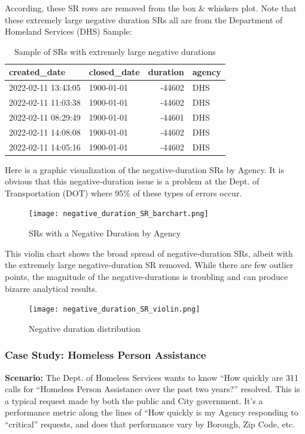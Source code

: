 \documentclass[12pt, titlepage]{article}
\begin{document}
{According, these  SR rows are removed from the box \& whiskers plot. Note that these extremely large negative duration SRs all
are from the Department of Homeland Services (DHS) Sample: 

\begin{table}[H]
    \centering
    \small
    \begin{tabular}{l l r l}
        \toprule
        \textbf{created\_date} & \textbf{closed\_date} & \textbf{duration} & \textbf{agency} \\
	        \midrule
	        2022-02-11 13:43:05 & 1900-01-01 & -44602 & DHS \\
	        2022-02-11 11:03:38 & 1900-01-01 & -44602 & DHS \\
	        2022-02-11 08:29:49 & 1900-01-01 & -44601 & DHS \\
	        2022-02-11 14:08:08 & 1900-01-01 & -44602 & DHS \\
	        2022-02-11 14:05:16 & 1900-01-01 & -44602 & DHS \\
	        \bottomrule
    \end{tabular}
    \caption{Sample of SRs with extremely large negative durations}
    \label{tab:extreme_negative_durations}
\end{table}

Here is a graphic visualization of the negative-duration SRs by Agency. It is obvious that this
negative-duration issue is a problem at the Dept. of Transportation (DOT) where 95\% of these
types of errors occur. 

\begin{figure}[H]
 	 \centering
	  \texttt{[image: negative\_duration\_SR\_barchart.png]}
	  \caption{SRs with a Negative Duration by Agency}
	  \label{fig:negative-duration}
\end{figure}

This violin chart shows the broad spread of negative-duration SRs, albeit with the extremely large 
negative-duration SR removed. While there are few outlier points, the magnitude of the negative-durations
is troubling and can produce bizarre analytical results.

\begin{figure}[H]
 	 \centering
	  \texttt{[image: negative\_duration\_SR\_violin.png]}
	  \caption{Negative duration distribution}
	  \label{fig:negative-duration-violin}
\end{figure}


\subsubsection{Case Study: Homeless Person Assistance}
		\textbf{Scenario:} The Dept. of Homeless Services wants to know ``How quickly are 311 calls for ``Homeless Person
		Assistance over the past two years?'' resolved. This is a typical request made by both the public and City government. It's a performance metric along the lines
		of ``How quickly is my Agency responding to ``critical'' requests, and does that performance vary by Borough, Zip Code, etc. 

}
\end{document}
